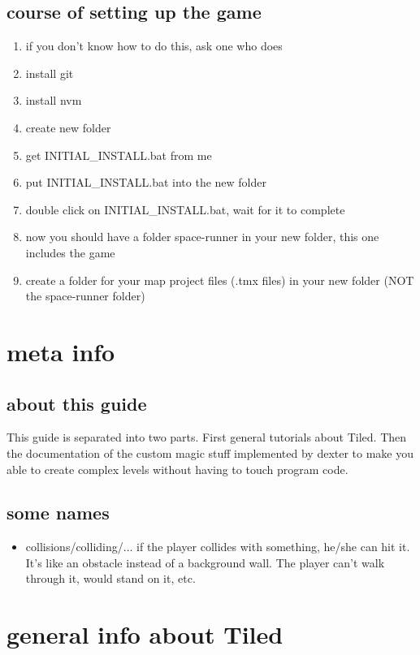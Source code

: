 \documentclass{article}
\begin{document}
\subsection{course of setting up the game}
\begin{enumerate}
	\item if you don't know how to do this, ask one who does
	\item install git
	\item install nvm
	\item create new folder
	\item get INITIAL\_INSTALL.bat from me
	\item put INITIAL\_INSTALL.bat into the new folder
	\item double click on INITIAL\_INSTALL.bat, wait for it to complete
	\item now you should have a folder space-runner in your new folder, this one includes the game
	\item create a folder for your map project files (.tmx files) in your new folder (NOT the space-runner folder)
\end{enumerate}

\section{meta info}
\subsection{about this guide}
This guide is separated into two parts. First general tutorials about Tiled. Then the documentation of the custom magic stuff implemented by dexter to make you able to create complex levels without having to touch program code.

\subsection{some names}
\begin{itemize}
	\item collisions/colliding/... if the player collides with something, he/she can hit it. It's like an obstacle instead of a background wall. The player can't walk through it, would stand on it, etc.
\end{itemize}

\section{general info about Tiled}
\end{document}
